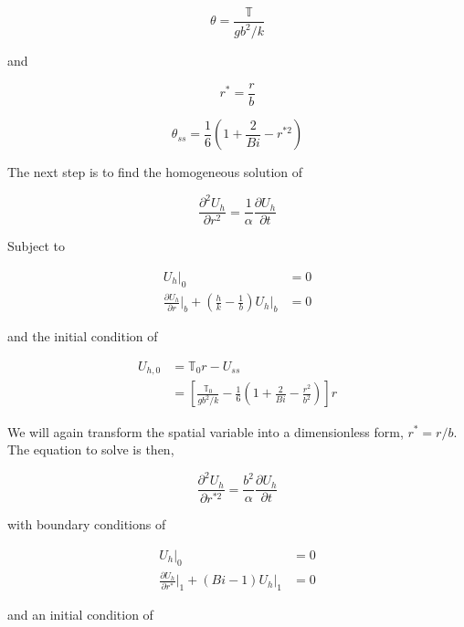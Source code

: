 \begin{equation}\label{eq:dimensionless-temp-definition}
    \theta = \frac{\mathbb{T}}{gb^2/k}
\end{equation}

and

\begin{equation}
    r^* = \frac{r}{b}
\end{equation}


\begin{equation}
    \theta_{ss} = \frac{1}{6} \left( 1 + \frac{2}{Bi} - r^{*2} \right)
\end{equation}

The next step is to find the homogeneous solution of 

\begin{equation}
    \frac{\partial^2 U_h}{\partial r^2} = \frac{1}{\alpha}\frac{\partial U_h}{\partial t}
\end{equation}

Subject to 

\begin{align}
    U_{h}\big|_0 &= 0\\
    \frac{\partial U_{h}}{\partial r}\big|_b + \left(\frac{h}{k} - \frac{1}{b}\right)U_{h}\big|_b &= 0
\end{align}

and the initial condition of

\begin{align}
    U_{h,0} &= \mathbb{T}_0r - U_{ss}\\
    & = \left[\frac{\mathbb{T}_0}{gb^2/k} - \frac{1}{6}\left(1 + \frac{2}{Bi} - \frac{r^2}{b^2}\right)\right]r
\end{align}

We will again transform the spatial variable into a dimensionless form, $r^* = r/b$. The equation to solve is then,

\begin{equation}
    \frac{\partial^2 U_h}{\partial r^{*2}} = \frac{b^2}{\alpha}\frac{\partial U_h}{\partial t}
\end{equation}

with boundary conditions of

\begin{align}
    U_{h}\big|_0 &= 0\\
    \frac{\partial U_{h}}{\partial r^*}\big|_1 + (Bi - 1)U_{h}\big|_1 &= 0
\end{align}

and an initial condition of

